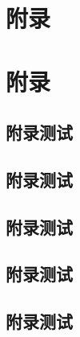 




\begin{Appendix}

\chapter{附录}

\chapter{附录}
\section{附录测试}

\end{Appendix}

\begin{Appendix}
	
\section{附录测试}

\section{附录测试}

\section{附录测试}
	
\end{Appendix}




\begin{Appendix}
	
\section{附录测试}
	
\end{Appendix}



